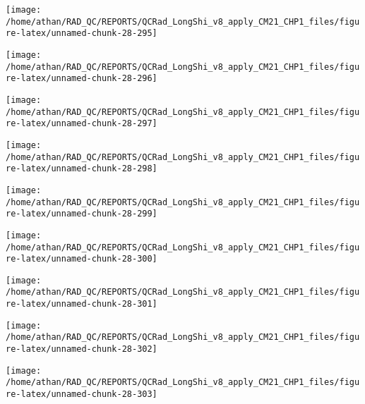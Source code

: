 \documentclass[
  10pt,
  a4paper,oneside]{article}
\begin{document}
\begin{center}\texttt{[image: /home/athan/RAD\_QC/REPORTS/QCRad\_LongShi\_v8\_apply\_CM21\_CHP1\_files/figure-latex/unnamed-chunk-28-295]} \end{center}

\begin{center}\texttt{[image: /home/athan/RAD\_QC/REPORTS/QCRad\_LongShi\_v8\_apply\_CM21\_CHP1\_files/figure-latex/unnamed-chunk-28-296]} \end{center}

\begin{center}\texttt{[image: /home/athan/RAD\_QC/REPORTS/QCRad\_LongShi\_v8\_apply\_CM21\_CHP1\_files/figure-latex/unnamed-chunk-28-297]} \end{center}

\begin{center}\texttt{[image: /home/athan/RAD\_QC/REPORTS/QCRad\_LongShi\_v8\_apply\_CM21\_CHP1\_files/figure-latex/unnamed-chunk-28-298]} \end{center}

\begin{center}\texttt{[image: /home/athan/RAD\_QC/REPORTS/QCRad\_LongShi\_v8\_apply\_CM21\_CHP1\_files/figure-latex/unnamed-chunk-28-299]} \end{center}

\begin{center}\texttt{[image: /home/athan/RAD\_QC/REPORTS/QCRad\_LongShi\_v8\_apply\_CM21\_CHP1\_files/figure-latex/unnamed-chunk-28-300]} \end{center}

\begin{center}\texttt{[image: /home/athan/RAD\_QC/REPORTS/QCRad\_LongShi\_v8\_apply\_CM21\_CHP1\_files/figure-latex/unnamed-chunk-28-301]} \end{center}

\begin{center}\texttt{[image: /home/athan/RAD\_QC/REPORTS/QCRad\_LongShi\_v8\_apply\_CM21\_CHP1\_files/figure-latex/unnamed-chunk-28-302]} \end{center}

\begin{center}\texttt{[image: /home/athan/RAD\_QC/REPORTS/QCRad\_LongShi\_v8\_apply\_CM21\_CHP1\_files/figure-latex/unnamed-chunk-28-303]} \end{center}
\end{document}
